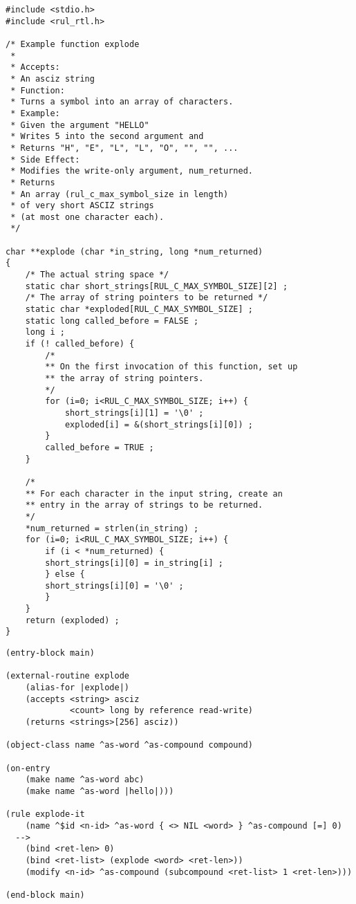 \begin{exampl}
\begin{verbatim}
#include <stdio.h>
#include <rul_rtl.h>

/* Example function explode
 *
 * Accepts:
 * An asciz string
 * Function:
 * Turns a symbol into an array of characters.
 * Example:
 * Given the argument "HELLO"
 * Writes 5 into the second argument and
 * Returns "H", "E", "L", "L", "O", "", "", ...
 * Side Effect:
 * Modifies the write-only argument, num_returned.
 * Returns
 * An array (rul_c_max_symbol_size in length)
 * of very short ASCIZ strings
 * (at most one character each).
 */

char **explode (char *in_string, long *num_returned)
{
    /* The actual string space */
    static char short_strings[RUL_C_MAX_SYMBOL_SIZE][2] ;
    /* The array of string pointers to be returned */
    static char *exploded[RUL_C_MAX_SYMBOL_SIZE] ;
    static long called_before = FALSE ;
    long i ;
    if (! called_before) {
        /*
        ** On the first invocation of this function, set up
        ** the array of string pointers.
        */
        for (i=0; i<RUL_C_MAX_SYMBOL_SIZE; i++) {
            short_strings[i][1] = '\0' ;
            exploded[i] = &(short_strings[i][0]) ;
        }
        called_before = TRUE ;
    }

    /*
    ** For each character in the input string, create an
    ** entry in the array of strings to be returned.
    */
    *num_returned = strlen(in_string) ;
    for (i=0; i<RUL_C_MAX_SYMBOL_SIZE; i++) {
        if (i < *num_returned) {
        short_strings[i][0] = in_string[i] ;
        } else {
        short_strings[i][0] = '\0' ;
        }
    }
    return (exploded) ;
}
\end{verbatim}
\label{e:6-5}
\end{exampl}

\begin{exampl}
\begin{verbatim}
(entry-block main)

(external-routine explode
    (alias-for |explode|)
    (accepts <string> asciz
             <count> long by reference read-write)
    (returns <strings>[256] asciz))
 
(object-class name ^as-word ^as-compound compound)

(on-entry
    (make name ^as-word abc)
    (make name ^as-word |hello|)))

(rule explode-it
    (name ^$id <n-id> ^as-word { <> NIL <word> } ^as-compound [=] 0)
  -->
    (bind <ret-len> 0)
    (bind <ret-list> (explode <word> <ret-len>))
    (modify <n-id> ^as-compound (subcompound <ret-list> 1 <ret-len>)))

(end-block main)
\end{verbatim}
\label{e:6-6}
\end{exampl}

